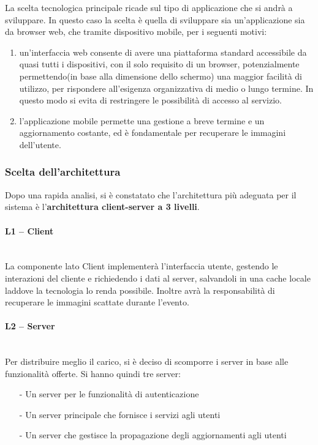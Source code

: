 La scelta tecnologica principale ricade sul tipo di applicazione che si andrà a
sviluppare.
In questo caso la scelta è quella di sviluppare sia un'applicazione sia da browser web, che tramite dispositivo mobile, per i seguenti motivi:
\begin{enumerate}
    \item un'interfaccia web consente di avere una
          piattaforma standard accessibile da quasi tutti i dispositivi, con il solo
          requisito di un browser, potenzialmente permettendo(in base alla dimensione dello schermo) una maggior facilità di utilizzo, per rispondere all'esigenza organizzativa di medio o lungo termine.
          In questo modo si evita di restringere le possibilità di accesso al servizio.
    \item  l'applicazione mobile permette una gestione a breve termine e un aggiornamento costante, ed è fondamentale per recuperare le immagini dell'utente.
\end{enumerate}
\newpage
\subsubsection{Scelta dell'architettura}

Dopo una rapida analisi, si è constatato che l'architettura più adeguata per il
sistema è l'\textbf{architettura client-server a 3 livelli}.

\paragraph{L1 -- Client}\mbox{}\\
La componente lato Client implementerà l'interfaccia utente, gestendo le interazioni del cliente e richiedendo i dati al server,
salvandoli in una cache locale laddove la tecnologia lo renda possibile. Inoltre avrà la responsabilità di recuperare le immagini scattate durante l'evento.

\paragraph{L2 -- Server}\mbox{}\\
Per distribuire meglio il carico, si è deciso di scomporre i server in base alle funzionalità offerte. Si hanno quindi tre server:

\begin{itemize}
    \item[-] Un server per le funzionalità di autenticazione
    \item[-] Un server principale che fornisce i servizi agli utenti
    \item[-] Un server che gestisce la propagazione degli aggiornamenti agli utenti
\end{itemize}

